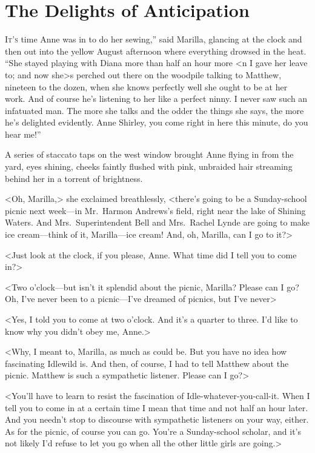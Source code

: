 \chapter{The Delights of Anticipation}

\lettrine[ante=“,]{I}{t's} time Anne was in to do her sewing,” said Marilla, glancing at the clock and then out into the yellow August afternoon where everything drowsed in the heat. “She stayed playing with Diana more than half an hour more <n I gave her leave to; and now she>s perched out there on the woodpile talking to Matthew, nineteen to the dozen, when she knows perfectly well she ought to be at her work. And of course he's listening to her like a perfect ninny. I never saw such an infatuated man. The more she talks and the odder the things she says, the more he's delighted evidently. Anne Shirley, you come right in here this minute, do you hear me!”

A series of staccato taps on the west window brought Anne flying in from the yard, eyes shining, cheeks faintly flushed with pink, unbraided hair streaming behind her in a torrent of brightness.

<Oh, Marilla,> she exclaimed breathlessly, <there's going to be a Sunday-school picnic next week—in Mr.~Harmon Andrews's field, right near the lake of Shining Waters. And Mrs.~Superintendent Bell and Mrs.~Rachel Lynde are going to make ice cream—think of it, Marilla—ice cream! And, oh, Marilla, can I go to it?>

<Just look at the clock, if you please, Anne. What time did I tell you to come in?>

<Two o'clock—but isn't it splendid about the picnic, Marilla? Please can I go? Oh, I've never been to a picnic—I've dreamed of picnics, but I've never\longdash>

<Yes, I told you to come at two o'clock. And it's a quarter to three. I'd like to know why you didn't obey me, Anne.>

<Why, I meant to, Marilla, as much as could be. But you have no idea how fascinating Idlewild is. And then, of course, I had to tell Matthew about the picnic. Matthew is such a sympathetic listener. Please can I go?>

<You'll have to learn to resist the fascination of Idle-whatever-you-call-it. When I tell you to come in at a certain time I mean that time and not half an hour later. And you needn't stop to discourse with sympathetic listeners on your way, either. As for the picnic, of course you can go. You're a Sunday-school scholar, and it's not likely I'd refuse to let you go when all the other little girls are going.>

